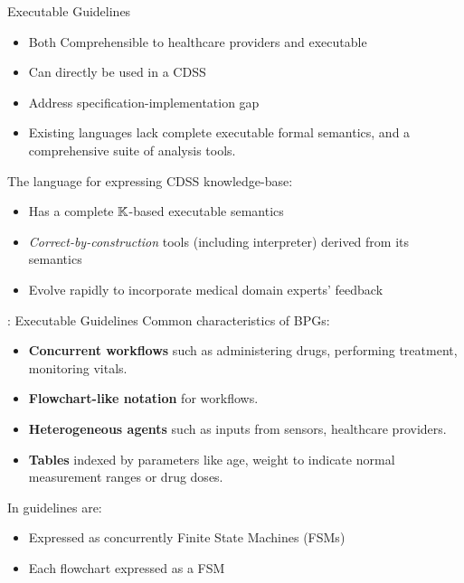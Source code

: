 \documentclass{beamer}
\begin{document}
\begin{frame}{Executable Guidelines}
  \begin{itemize}
    \item Both \alert{Comprehensible} to healthcare providers and \alert{executable}
    \item Can directly be used in a CDSS
    \item Address \alert{specification-implementation gap}
      \pause
    \item Existing languages lack complete executable formal semantics,
      and a comprehensive suite of analysis tools.
  \end{itemize}
  \pause
  The \MediK{} language for expressing CDSS knowledge-base:
  \begin{itemize}
    \item Has a complete $\mathbb{K}$-based executable semantics
    \item \emph{Correct-by-construction} tools (including interpreter)
      derived from its semantics
    \item Evolve rapidly to incorporate medical domain experts' feedback

  \end{itemize}
\end{frame}

\begin{frame}{\MediK{}: Executable Guidelines}
  Common characteristics of BPGs:
  \begin{itemize}
    \item \textbf{Concurrent workflows} such as administering
      drugs, performing treatment, monitoring vitals.
    \item \textbf{Flowchart-like notation} for workflows.
    \item \textbf{Heterogeneous agents} such as inputs from sensors, healthcare
      providers.
    \item \textbf{Tables} indexed by parameters like age, weight to indicate
      normal measurement ranges or drug doses.
  \end{itemize}
  \pause
  In \MediK{} guidelines are:
  \begin{itemize}
    \item Expressed as concurrently Finite State Machines (FSMs)
    \item Each flowchart expressed as a FSM
  \end{itemize}
\end{frame}
\end{document}
